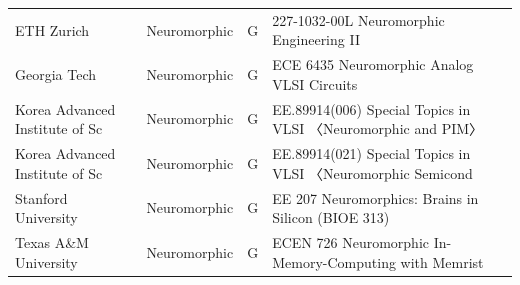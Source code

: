\documentclass[10pt]{article}
\begin{document}
\begin{longtable}{@{}llll@{}}
ETH Zurich & Neuromorphic & G & 227-1032-00L Neuromorphic Engineering II \\
Georgia Tech & Neuromorphic & G & ECE 6435 Neuromorphic Analog VLSI Circuits \\
Korea Advanced Institute of Sc & Neuromorphic & G & EE.89914(006) Special Topics in VLSI 〈Neuromorphic and PIM〉 \\
Korea Advanced Institute of Sc & Neuromorphic & G & EE.89914(021) Special Topics in VLSI 〈Neuromorphic Semicond \\
Stanford University & Neuromorphic & G & EE 207 Neuromorphics: Brains in Silicon (BIOE 313) \\
Texas A\&M University & Neuromorphic & G & ECEN 726 Neuromorphic In-Memory-Computing with Memrist \\
\end{longtable}
\end{document}
